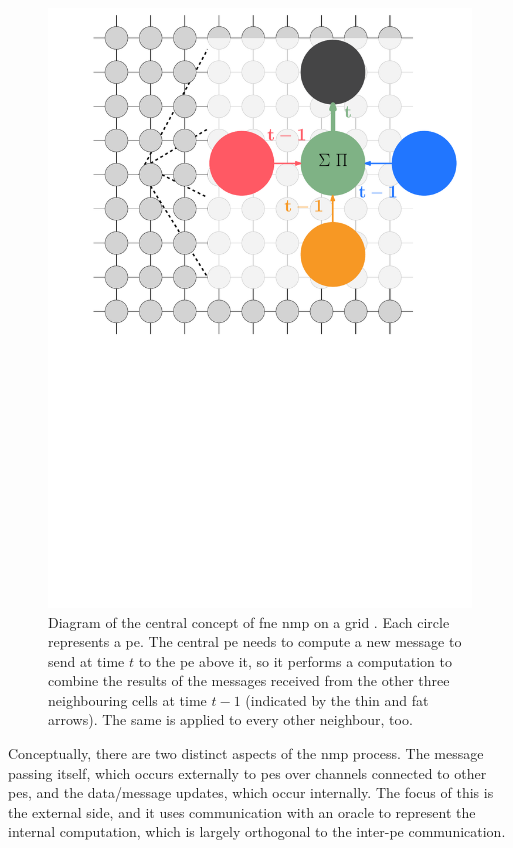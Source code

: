 \begin{figure}
    \centering
    \includegraphics[keepaspectratio,width=1.0\linewidth]{chapters/nmp/images/bp_diagram_recoloured.pdf}
    \caption[Diagram of the central concept of \gls{fne}  on a grid]{Diagram of the central concept of \gls{fne} \gls{nmp} on a grid \cite{lbpmpsmpic}.  Each circle represents a \gls{pe}.  The central \gls{pe} needs to compute a new message to send at time \(t\) to the \gls{pe} above it, so it performs a computation to combine the results of the messages received from the other three neighbouring cells at time \(t - 1\) (indicated by the thin and fat arrows).  The same is applied to every other neighbour, too.}
    \label{fig:nmp:gridmessaging}
\end{figure}

Conceptually, there are two distinct aspects of the \gls{nmp} process.  The message passing itself, which occurs externally to \glspl{pe} over channels connected to other \glspl{pe}, and the data/message updates, which occur internally.  The focus of this  is the external side, and it uses communication with an oracle to represent the internal computation, which is largely orthogonal to the inter-\gls{pe} communication.

